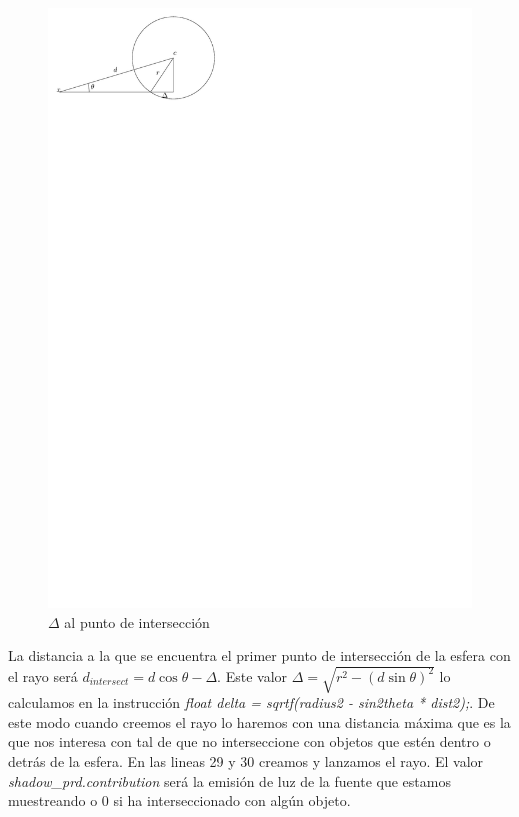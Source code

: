 \begin{figure}[h]
\centering
\includegraphics[scale=1.0]{sample_esfera.pdf}
\caption{  $\Delta $ al punto de intersección}
\end{figure}

La distancia a la que se encuentra el primer punto de intersección de la esfera con el rayo será $d_{intersect} = d \cos\theta - \Delta $. Este valor $\Delta = \sqrt{r^2 - (d\sin\theta)^2}$ lo calculamos en la instrucción \emph{float delta = sqrtf(radius2 - sin2theta * dist2);}. De este modo cuando creemos el rayo lo haremos con una distancia máxima que es la que nos interesa con tal de que no interseccione con objetos que estén dentro o detrás de la esfera. En las lineas 29 y 30 creamos y lanzamos el rayo. El valor \emph{shadow\_prd.contribution} será la emisión de luz de la fuente que estamos muestreando o $0$ si ha interseccionado con algún objeto.

